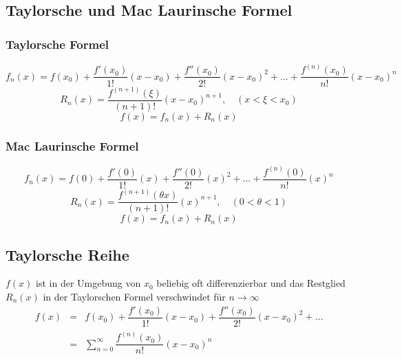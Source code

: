 \subsection{Taylorsche und Mac Laurinsche Formel}
\subsubsection{Taylorsche Formel}
\begin{equation}
\boxed{f_n\left(x\right)=f\left(x_0\right)+\dfrac{f'\left(x_0\right)}{1!}\left(x-x_0\right)+\dfrac{f''\left(x_0\right)}{2!}\left(x-x_0\right)^2+\dotso+\dfrac{f^{\left(n\right)}\left(x_0\right)}{n!}\left(x-x_0\right)^n}
\end{equation}
\begin{equation}
\boxed{R_n\left(x\right)=\dfrac{f^{\left(n+1\right)}\left(\xi\right)}{\left(n+1\right)!}\left(x-x_0\right)^{n+1},\quad \left(x< \xi< x_0\right)}
\end{equation}
\begin{equation}
\boxed{f\left(x\right)=f_n\left(x\right)+R_n\left(x\right)}
\end{equation}
\subsubsection{Mac Laurinsche Formel}
\begin{equation}
\boxed{f_n\left(x\right)=f\left(0\right)+\dfrac{f'\left(0\right)}{1!}\left(x\right)+\dfrac{f''\left(0\right)}{2!}\left(x\right)^2+\dotso+\dfrac{f^{\left(n\right)}\left(0\right)}{n!}\left(x\right)^n}
\end{equation}
\begin{equation}
\boxed{R_n\left(x\right)=\dfrac{f^{\left(n+1\right)}\left(\theta x\right)}{\left(n+1\right)!}\left(x\right)^{n+1},\quad \left(0< \theta< 1\right)}
\end{equation}
\begin{equation}
\boxed{f\left(x\right)=f_n\left(x\right)+R_n\left(x\right)}
\end{equation}
\subsection{Taylorsche Reihe}
$f\left(x\right)$ ist in der Umgebung von $x_0$ beliebig oft differenzierbar und das Restglied $R_n\left(x\right)$ in der Taylorschen Formel verschwindet für $n\rightarrow \infty$
\begin{equation}
\boxed{
\begin{array}{lll}
f\left(x\right)&=&f\left(x_0\right)+\dfrac{f'\left(x_0\right)}{1!}\left(x-x_0\right)+\dfrac{f''\left(x_0\right)}{2!}\left(x-x_0\right)^2+\dotso\\
&=&\displaystyle \sum_{n=0}^{\infty}\dfrac{f^{\left(n\right)}\left(x_0\right)}{n!}\left(x-x_0\right)^n
\end{array}
}
\end{equation}
